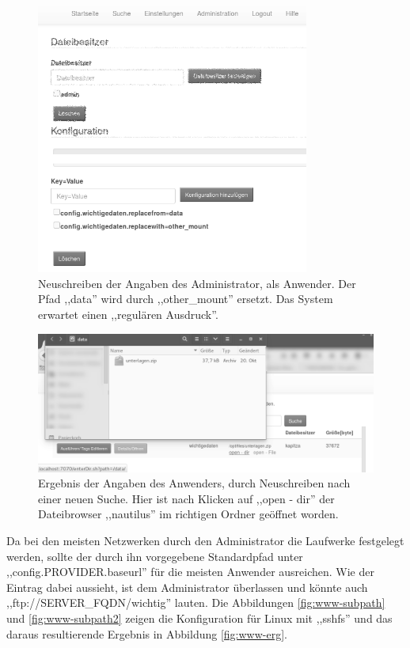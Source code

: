 \documentclass[oneside, ngerman, toc=bibliography,bibliography=totoc,listof=entryprefix, open=right,numbers=noenddot,fontsize=12pt]{scrbook}
\begin{document}
\begin{figure}[htbp] 
    \centering
    \includegraphics[width=0.8\textwidth]{Masterarbeit_Bilder/user_rewrite_other_mount.png}
    \caption{Neuschreiben der Angaben des Administrator, als Anwender. Der Pfad ,,data'' wird durch ,,other\_mount'' ersetzt. Das System erwartet einen ,,regulären Ausdruck''. }
    \label{fig:www-subpath3}
\end{figure}  

\begin{figure}[htbp] 
    \centering
    \includegraphics[width=\textwidth]{Masterarbeit_Bilder/open_mount_dir.png}
    \caption{Ergebnis der Angaben des Anwenders, durch Neuschreiben nach einer neuen Suche. Hier ist nach Klicken auf ,,open - dir'' der Dateibrowser ,,nautilus'' im richtigen Ordner geöffnet worden.}
    \label{fig:www-erg2}
\end{figure}  




Da bei den meisten Netzwerken durch den Administrator die Laufwerke festgelegt werden, sollte der durch ihn vorgegebene Standardpfad unter ,,config.{PROVIDER}.baseurl'' für die meisten Anwender ausreichen. Wie der Eintrag dabei aussieht, ist dem Administrator überlassen und könnte auch ,,ftp://SERVER\_FQDN/wichtig'' lauten.
Die Abbildungen \ref{fig:www-subpath} und \ref{fig:www-subpath2} zeigen die Konfiguration für Linux mit ,,sshfs'' und das daraus resultierende Ergebnis in Abbildung \ref{fig:www-erg}.
\end{document}
